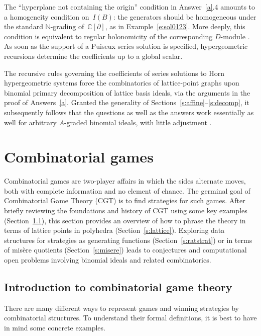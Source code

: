 \documentclass[12pt]{amsart}
\numberwithin{equation}{section}
\theoremstyle{definition}
\begin{document}
The ``hyperplane not containing the origin'' condition in
Answer~\ref{a}.4 amounts to a homogeneity condition on~$I(B)$: the
generators should be homogeneous under the standard ${\mathbb{N}}$-grading
of~${\mathbb{C}}[{\partial}]$, as in Example~\ref{e:sol0123}.  More deeply, this
condition is equivalent to regular holonomicity of the corresponding
$D$-module \cite{uli06}.  As soon as the support of a Puiseux series
solution is specified, hypergeometric recursions determine the
coefficients up to a global scalar.

The recursive rules governing the coefficients of series solutions to
Horn hypergeometric systems force the combinatorics of lattice-point
graphs upon binomial primary decomposition of lattice basis ideals,
via the arguments in the proof of Answers~\ref{a}.  Granted the
generality of Sections~\ref{s:affine}--\ref{s:decomp}, it subsequently
follows that the questions as well as the answers work essentially as
well for arbitrary $A$-graded binomial ideals, with little adjustment
\cite{dmm}.

\section{Combinatorial games}\label{s:games}

Combinatorial games are two-player affairs in which the sides
alternate moves, both with complete information and no element of
chance.  The germinal goal of Combinatorial Game Theory (CGT) is to
find strategies for such games.  After briefly reviewing the
foundations and history of CGT using some key examples
(Section~\ref{s:cgt}), this section provides an overview of how to
phrase the theory in terms of lattice points in polyhedra
(Section~\ref{s:lattice}).  Exploring data structures for strategies
as generating functions (Section~\ref{s:ratstrat}) or in terms of
mis\`ere quotients (Section~\ref{s:misere}) leads to conjectures and
computational open problems involving binomial ideals and related
combinatorics.

\subsection{Introduction to combinatorial game theory}\label{s:cgt}
There are many different ways to represent games and winning
strategies by combinatorial structures.  To understand their formal
definitions, it is best to have in mind some concrete examples.
\end{document}
